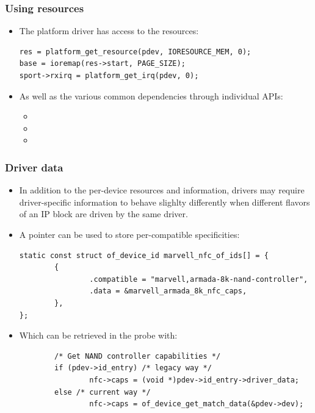 \begin{frame}[fragile]
  \frametitle{Using resources}
  \begin{itemize}
  \item The platform driver has access to the resources:
    \begin{block}{}
  \begin{verbatim}
res = platform_get_resource(pdev, IORESOURCE_MEM, 0);
base = ioremap(res->start, PAGE_SIZE);
sport->rxirq = platform_get_irq(pdev, 0);
  \end{verbatim}
  \end{block}
  \item As well as the various common dependencies through individual
    APIs:
    \begin{itemize}
    \item {}
    \item {}
    \item {}
    \end{itemize}
  \end{itemize}
\end{frame}

\begin{frame}[fragile]
  \frametitle{Driver data}
  \begin{itemize}
  \item In addition to the per-device resources and information, drivers
    may require driver-specific information to behave slighlty
    differently when different flavors of an IP block are driven by the
    same driver.
  \item A  pointer can be used to store
    per-compatible specificities:
    \begin{block}{}
      \begin{verbatim}
static const struct of_device_id marvell_nfc_of_ids[] = {
        {
                .compatible = "marvell,armada-8k-nand-controller",
                .data = &marvell_armada_8k_nfc_caps,
        },
};
  \end{verbatim}
  \end{block}
  \item Which can be retrieved in the probe with:
    \begin{block}{}
  \begin{verbatim}
        /* Get NAND controller capabilities */
        if (pdev->id_entry) /* legacy way */
                nfc->caps = (void *)pdev->id_entry->driver_data;
        else /* current way */
                nfc->caps = of_device_get_match_data(&pdev->dev);
  \end{verbatim}
  \end{block}
  \end{itemize}
\end{frame}
